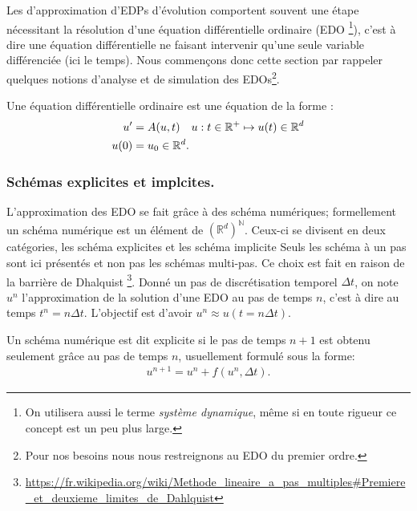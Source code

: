 Les d'approximation d'EDPs d'évolution comportent souvent une étape nécessitant la résolution d'une équation différentielle ordinaire (EDO
\footnote{On utilisera aussi le terme \textit{système dynamique}, même si en toute rigueur ce concept est un peu plus large.}),
c'est à dire une équation différentielle ne faisant intervenir qu'une seule variable différenciée (ici le temps). Nous commençons donc cette section par rappeler 
quelques notions d'analyse et de simulation des EDOs\footnote{Pour nos besoins nous nous restreignons au EDO du premier ordre.}.\par

\begin{definition}
    Une équation différentielle ordinaire est une équation de la forme :
    \begin{align}
        u' &= A(u,t)\quad u : t \in \mathbb{R}^+ \mapsto u(t) \in \mathbb{R}^d\\\notag
        u(0)&=u_0 \in \mathbb{R}^d.
    \end{align}
\end{definition}
\subsubsection{Schémas explicites et implcites.}
L'approximation des EDO se fait grâce à des schéma numériques; formellement un schéma numérique est un élément de $(\mathbb{R}^d)^\mathbb{N}$. 
Ceux-ci se divisent en deux catégories, les schéma explicites et les schéma implicite
Seuls les schéma à un pas sont ici présentés et non pas les schémas multi-pas. Ce choix est fait en raison de la barrière de Dhalquist
\footnote{\url{https://fr.wikipedia.org/wiki/Methode_lineaire_a_pas_multiples\#Premiere_et_deuxieme_limites_de_Dahlquist}}.
Donné un pas de discrétisation temporel $\Delta t$, on note $u^n$ l'approximation de la solution d'une EDO au pas de temps $n$, c'est à dire au temps $t^n = n \Delta t$.
L'objectif est d'avoir $u^n \approx u(t=n\Delta t)$.

\begin{definition}
    Un schéma numérique est dit explicite si le pas de temps $n+1$ est obtenu seulement grâce au pas de temps $n$, usuellement formulé sous la forme:
    \begin{align}
        u^{n+1} = u^n + f(u^n ,\Delta t ).
    \end{align}
\end{definition}

